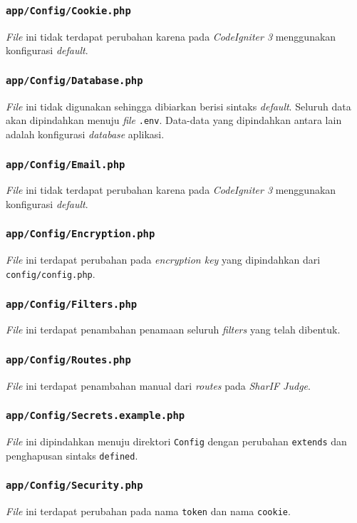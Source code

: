 \subsubsection{\texttt{app/Config/Cookie.php}}
\textit{File} ini tidak terdapat perubahan karena pada \textit{CodeIgniter 3} menggunakan konfigurasi \textit{default}.
\subsubsection{\texttt{app/Config/Database.php}}
\textit{File} ini tidak digunakan sehingga dibiarkan berisi sintaks \textit{default}. Seluruh data akan dipindahkan menuju \textit{file} \texttt{.env}. Data-data yang dipindahkan antara lain adalah konfigurasi \textit{database} aplikasi.
\subsubsection{\texttt{app/Config/Email.php}}
\textit{File} ini tidak terdapat perubahan karena pada \textit{CodeIgniter 3} menggunakan konfigurasi \textit{default}.
\subsubsection{\texttt{app/Config/Encryption.php}}
\textit{File} ini terdapat perubahan pada \textit{encryption key} yang dipindahkan dari \texttt{config/config.php}.
\subsubsection{\texttt{app/Config/Filters.php}}
\textit{File} ini terdapat penambahan penamaan seluruh \textit{filters} yang telah dibentuk.
\subsubsection{\texttt{app/Config/Routes.php}}
\textit{File} ini terdapat penambahan manual dari \textit{routes} pada \textit{SharIF Judge}.
\subsubsection{\texttt{app/Config/Secrets.example.php}}
\textit{File} ini dipindahkan menuju direktori \texttt{Config} dengan perubahan \texttt{extends} dan penghapusan sintaks \texttt{defined}.
\subsubsection{\texttt{app/Config/Security.php}}
\textit{File} ini terdapat perubahan pada nama \texttt{token} dan nama \texttt{cookie}.
